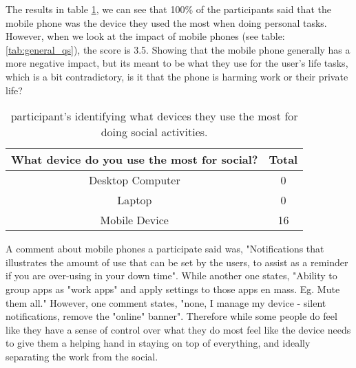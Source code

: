 \documentclass{sigchi}
\begin{document}
	The results in table \ref{tab:device_social}, we can see that 100\% of the participants said that the mobile phone was the device they used the most when doing personal tasks. However, when we look at the impact of mobile phones (see table: \ref{tab:general_qs}), the score is 3.5. Showing that the mobile phone generally has a more negative impact, but its meant to be what they use for the user's life tasks, which is a bit contradictory, is it that the phone is harming work or their private life?
	
	\begin{table}[ht]
		\centering
		\small
		\begin{tabular}[t]{ |c| c | }
			\hline
			What device do you use the most for social? & Total  \\ 
			\hline
			Desktop Computer & 0 \\ 
			\hline
			Laptop & 0  \\ 
			\hline
			Mobile Device &  16 \\
			\hline
		\end{tabular}
		\caption{participant's identifying what devices they use the most for doing social activities.}
		\label{tab:device_social}
	\end{table}%
	
	A comment about mobile phones a participate said was, "Notifications that illustrates the amount of use that can be set by the users, to assist as a reminder if you are over-using in your down time". While another one states, "Ability to group apps as "work apps" and apply settings to those apps en mass. Eg. Mute them all." However, one comment states, "none, I manage my device - silent notifications, remove the "online" banner". Therefore while some people do feel like they have a sense of control over what they do most feel like the device needs to give them a helping hand in staying on top of everything, and ideally separating the work from the social.
\end{document}
